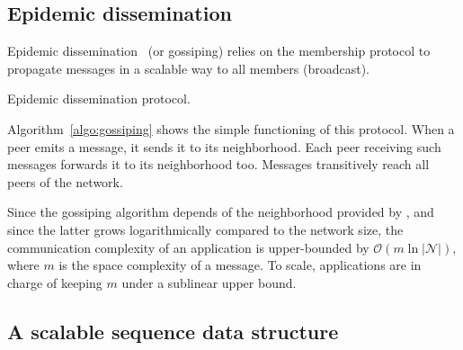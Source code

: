 

\subsection{Epidemic dissemination}
\label{subsec:gossiping}

Epidemic dissemination~\cite{birman1999bimodal,demers1987epidemic} (or
gossiping) relies on the membership protocol to propagate messages in a scalable
way to all members (broadcast).

\begin{algorithm}[h]
  
  \caption{\label{algo:gossiping}Epidemic dissemination protocol.}
\end{algorithm}

Algorithm~\ref{algo:gossiping} shows the simple functioning of this
protocol. When a peer emits a message, it sends it to its neighborhood. Each
peer receiving such messages forwards it to its neighborhood too. Messages
transitively reach all peers of the network.

Since the gossiping algorithm depends of the neighborhood provided by \SPRAY,
and since the latter grows logarithmically compared to the network size, the
communication complexity of an application is upper-bounded by
$\mathcal{O}(m \ln |\mathcal{N}|)$, where $m$ is the space complexity of a
message. To scale, applications are in charge of keeping $m$ under a sublinear
upper bound.




\subsection{A scalable sequence data structure}

